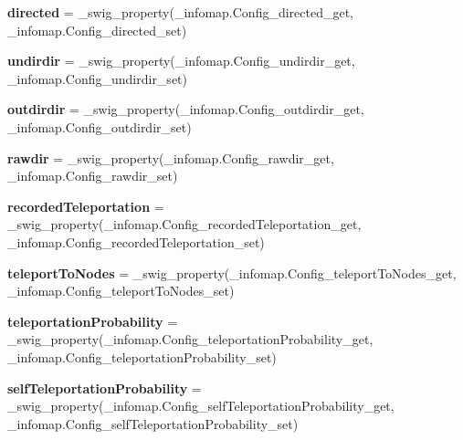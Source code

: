 \begin{DoxyCompactItemize}
{\bfseries directed} = \+\_\+swig\+\_\+property(\+\_\+infomap.\+Config\+\_\+directed\+\_\+get, \+\_\+infomap.\+Config\+\_\+directed\+\_\+set)
\item 
\mbox{\label{classinfomap_1_1Config_afe73746f70c51b4c671af9b2f4c6d7e8}} 
{\bfseries undirdir} = \+\_\+swig\+\_\+property(\+\_\+infomap.\+Config\+\_\+undirdir\+\_\+get, \+\_\+infomap.\+Config\+\_\+undirdir\+\_\+set)
\item 
\mbox{\label{classinfomap_1_1Config_a24d9478be0ee228294c18d04a7f9409d}} 
{\bfseries outdirdir} = \+\_\+swig\+\_\+property(\+\_\+infomap.\+Config\+\_\+outdirdir\+\_\+get, \+\_\+infomap.\+Config\+\_\+outdirdir\+\_\+set)
\item 
\mbox{\label{classinfomap_1_1Config_ae06b866030483fc4705a1e31470cbcf3}} 
{\bfseries rawdir} = \+\_\+swig\+\_\+property(\+\_\+infomap.\+Config\+\_\+rawdir\+\_\+get, \+\_\+infomap.\+Config\+\_\+rawdir\+\_\+set)
\item 
\mbox{\label{classinfomap_1_1Config_a69bbf69a985417f74d2f9531cd60f757}} 
{\bfseries recorded\+Teleportation} = \+\_\+swig\+\_\+property(\+\_\+infomap.\+Config\+\_\+recorded\+Teleportation\+\_\+get, \+\_\+infomap.\+Config\+\_\+recorded\+Teleportation\+\_\+set)
\item 
\mbox{\label{classinfomap_1_1Config_ae25b7774cb56220378092dd16805d591}} 
{\bfseries teleport\+To\+Nodes} = \+\_\+swig\+\_\+property(\+\_\+infomap.\+Config\+\_\+teleport\+To\+Nodes\+\_\+get, \+\_\+infomap.\+Config\+\_\+teleport\+To\+Nodes\+\_\+set)
\item 
\mbox{\label{classinfomap_1_1Config_afb018acad033607a9bdabd78499c997d}} 
{\bfseries teleportation\+Probability} = \+\_\+swig\+\_\+property(\+\_\+infomap.\+Config\+\_\+teleportation\+Probability\+\_\+get, \+\_\+infomap.\+Config\+\_\+teleportation\+Probability\+\_\+set)
\item 
\mbox{\label{classinfomap_1_1Config_ab8e6c0d6a7edfb3f19feefb5be496871}} 
{\bfseries self\+Teleportation\+Probability} = \+\_\+swig\+\_\+property(\+\_\+infomap.\+Config\+\_\+self\+Teleportation\+Probability\+\_\+get, \+\_\+infomap.\+Config\+\_\+self\+Teleportation\+Probability\+\_\+set)

\end{DoxyCompactItemize}
